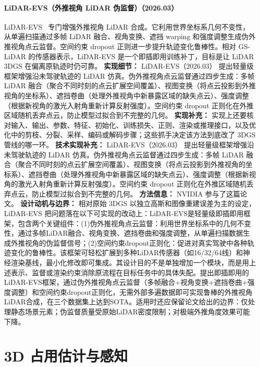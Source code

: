 \paragraph{LiDAR-EVS（外推视角 LiDAR 伪监督）（2026.03）}
LiDAR-EVS~\cite{2603_14763} 专门增强外推视角 LiDAR 合成。它利用世界坐标系几何不变性，从单遍扫描通过多帧 LiDAR 融合、视角变换、遮挡 warping 和强度调整生成伪外推视角点云监督。空间约束 dropout 正则进一步提升轨迹变化鲁棒性。相对 GS-LiDAR 的传感器表示，LiDAR-EVS 是一个即插即用训练补丁，目标是让 LiDAR 3DGS 在偏离原轨迹时仍可靠。
\textbf{实现细节：} LiDAR-EVS（2026.03） 提出轻量级框架增强沿未驾驶轨迹的 LiDAR 仿真。伪外推视角点云监督通过四步生成：多帧 LiDAR 融合（聚合不同时刻的点云扩展空间覆盖）、视图变换（将点云投影到外推视角的坐标系）、遮挡卷曲（处理外推视角中新暴露区域的缺失点云）、强度调整（根据新视角的激光入射角重新计算反射强度）。空间约束 dropout 正则化在外推区域随机丢弃点云，防止模型过拟合到不完整的几何。
\textbf{实现补充：} 实现上还要核对输入、输出、参数、特征、初始化、训练损失、正则、渲染或推理接口，以及优化中的剪枝、分裂、采样、编码或解码步骤；这些抓手决定该方法到底改了 3DGS 管线的哪一环。
\textbf{技术实现补充：} LiDAR-EVS（2026.03） 提出轻量级框架增强沿未驾驶轨迹的 LiDAR 仿真。伪外推视角点云监督通过四步生成：多帧 LiDAR 融合（聚合不同时刻的点云扩展空间覆盖）、视图变换（将点云投影到外推视角的坐标系）、遮挡卷曲（处理外推视角中新暴露区域的缺失点云）、强度调整（根据新视角的激光入射角重新计算反射强度）。空间约束 dropout 正则化在外推区域随机丢弃点云，防止模型过拟合到不完整的几何。
\textbf{方法信息：} NVIDIA 参与了这篇论文。
\textbf{设计动机与边界：} 相对原始 3DGS 以独立高斯和图像重建误差为主的设定，LiDAR-EVS 把问题落在以下可实现的改动上：LiDAR-EVS是轻量级即插即用框架，包含两个关键组件：(1)伪外推视角点云监督：利用世界坐标系中的几何不变性，通过多帧LiDAR融合、视角变换、遮挡卷曲和强度调整，从单遍扫描数据生成外推视角的伪监督信号；(2)空间约束dropout正则化：促进对真实驾驶中各种轨迹变化的鲁棒性。该框架可轻松扩展到多种LiDAR传感器（如16/32/64线）和神经渲染基线，最小化修改即可集成。其设计目的不是单独增加一个模块，而是用上述表示、监督或渲染约束消除原流程在目标任务中的具体失配。提出即插即用的LiDAR-EVS框架，通过伪外推视角点云监督（多帧融合+视角变换+遮挡卷曲+强度调整）和空间约束dropout正则化，无需外部多遍数据即可实现鲁棒的外推视角LiDAR合成，在三个数据集上达到SOTA。适用时还应保留论文给出的边界：仅处理静态场景元素；伪监督质量受原始LiDAR密度限制；对极端外推角度效果可能下降。

\section{3D 占用估计与感知}

